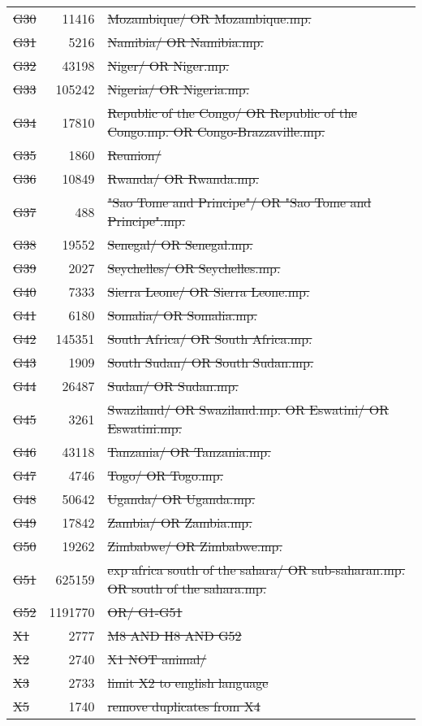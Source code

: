 \begin{longtable}{lrp{}}
  \st{G30} &   \num{11416} & \st{Mozambique/ OR Mozambique.mp.} \\
  \st{G31} &    \num{5216} & \st{Namibia/ OR Namibia.mp.} \\
  \st{G32} &   \num{43198} & \st{Niger/ OR Niger.mp.} \\
  \st{G33} &  \num{105242} & \st{Nigeria/ OR Nigeria.mp.} \\
  \st{G34} &   \num{17810} & \st{Republic of the Congo/ OR Republic of the Congo.mp. OR Congo-Brazzaville.mp.} \\
  \st{G35} &    \num{1860} & \st{Reunion/} \\
  \st{G36} &   \num{10849} & \st{Rwanda/ OR Rwanda.mp.} \\
  \st{G37} &     \num{488} & \st{"Sao Tome and Principe"/ OR "Sao Tome and Principe".mp.} \\
  \st{G38} &   \num{19552} & \st{Senegal/ OR Senegal.mp.} \\
  \st{G39} &    \num{2027} & \st{Seychelles/ OR Seychelles.mp.} \\
  \st{G40} &    \num{7333} & \st{Sierra Leone/ OR Sierra Leone.mp.} \\
  \st{G41} &    \num{6180} & \st{Somalia/ OR Somalia.mp.} \\
  \st{G42} &  \num{145351} & \st{South Africa/ OR South Africa.mp.} \\
  \st{G43} &    \num{1909} & \st{South Sudan/ OR South Sudan.mp.} \\
  \st{G44} &   \num{26487} & \st{Sudan/ OR Sudan.mp.} \\
  \st{G45} &    \num{3261} & \st{Swaziland/ OR Swaziland.mp. OR Eswatini/ OR Eswatini.mp.} \\
  \st{G46} &   \num{43118} & \st{Tanzania/ OR Tanzania.mp.} \\
  \st{G47} &    \num{4746} & \st{Togo/ OR Togo.mp.} \\
  \st{G48} &   \num{50642} & \st{Uganda/ OR Uganda.mp.} \\
  \st{G49} &   \num{17842} & \st{Zambia/ OR Zambia.mp.} \\
  \st{G50} &   \num{19262} & \st{Zimbabwe/ OR Zimbabwe.mp.} \\
  \st{G51} &  \num{625159} & \st{exp africa south of the sahara/ OR sub-saharan.mp. OR south of the sahara.mp.} \\
  \st{G52} & \num{1191770} & \st{OR/ G1-G51} \\
  \midrule
   \st{X1} & \num{2777} & \st{M8 AND H8 AND G52} \\
   \st{X2} & \num{2740} & \st{X1 NOT animal/} \\
   \st{X3} & \num{2733} & \st{limit X2 to english language} \\
   \st{X5} & \num{1740} & \st{remove duplicates from X4}    \\
\end{longtable}
\endgroup
